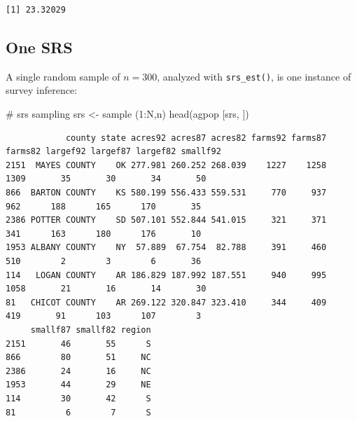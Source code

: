 \documentclass[
  letterpaper,
  DIV=11,
  numbers=noendperiod]{scrreprt}
\newenvironment{Shaded}{\begin{snugshade}}{\end{snugshade}}
\newcommand{\AttributeTok}[1]{\textcolor[rgb]{0.40,0.45,0.13}{#1}}
\newcommand{\CommentTok}[1]{\textcolor[rgb]{0.37,0.37,0.37}{#1}}
\newcommand{\ConstantTok}[1]{\textcolor[rgb]{0.56,0.35,0.01}{#1}}
\newcommand{\DecValTok}[1]{\textcolor[rgb]{0.68,0.00,0.00}{#1}}
\newcommand{\FunctionTok}[1]{\textcolor[rgb]{0.28,0.35,0.67}{#1}}
\newcommand{\NormalTok}[1]{\textcolor[rgb]{0.00,0.23,0.31}{#1}}
\newcommand{\OtherTok}[1]{\textcolor[rgb]{0.00,0.23,0.31}{#1}}
\newcommand{\SpecialCharTok}[1]{\textcolor[rgb]{0.37,0.37,0.37}{#1}}
\newcommand{\StringTok}[1]{\textcolor[rgb]{0.13,0.47,0.30}{#1}}
\renewcommand{\[}{\begin{equation}}
\renewcommand{\]}{\end{equation}}
\begin{document}
\begin{verbatim}
[1] 23.32029
\end{verbatim}

\subsection{One SRS}\label{one-srs}

A single random sample of \(n=300\), analyzed with \texttt{srs\_est()},
is one instance of survey inference:

\begin{Shaded}
\begin{Highlighting}[]
\CommentTok{\# srs sampling}
\NormalTok{srs }\OtherTok{\textless{}{-}} \FunctionTok{sample}\NormalTok{ (}\DecValTok{1}\SpecialCharTok{:}\NormalTok{N,n)}
\FunctionTok{head}\NormalTok{(agpop [srs, ])}
\end{Highlighting}
\end{Shaded}

\begin{verbatim}
            county state acres92 acres87 acres82 farms92 farms87 farms82 largef92 largef87 largef82 smallf92
2151  MAYES COUNTY    OK 277.981 260.252 268.039    1227    1258    1309       35       30       34       50
866  BARTON COUNTY    KS 580.199 556.433 559.531     770     937     962      188      165      170       35
2386 POTTER COUNTY    SD 507.101 552.844 541.015     321     371     341      163      180      176       10
1953 ALBANY COUNTY    NY  57.889  67.754  82.788     391     460     510        2        3        6       36
114   LOGAN COUNTY    AR 186.829 187.992 187.551     940     995    1058       21       16       14       30
81   CHICOT COUNTY    AR 269.122 320.847 323.410     344     409     419       91      103      107        3
     smallf87 smallf82 region
2151       46       55      S
866        80       51     NC
2386       24       16     NC
1953       44       29     NE
114        30       42      S
81          6        7      S
\end{verbatim}

\begin{Shaded}
\end{Shaded}
\end{document}
